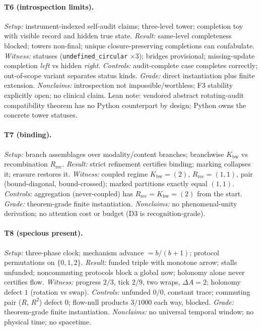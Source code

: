 \documentclass[11pt]{article}
\newcommand{\Kbw}{K_{\mathrm{bw}}}
\newcommand{\Rrec}{R_{\mathrm{rec}}}
\theoremstyle{definition}
\begin{document}
\paragraph{T6 (introspection limits).}
\emph{Setup:} instrument-indexed self-audit claims; three-level tower;
completion toy with visible record and hidden true state. \emph{Result:}
same-level completeness blocked; towers non-final; unique closure-preserving
completions can confabulate. \emph{Witness:} statuses
(\texttt{undefined\_circular} $\times 3$); bridges provisional; missing-update
completion \emph{left} vs hidden \emph{right}. \emph{Controls:}
audit-complete case completes correctly; out-of-scope variant separates
status kinds. \emph{Grade:} direct instantiation plus finite extension.
\emph{Nonclaims:} introspection not impossible/worthless; F3 stability
explicitly open; no clinical claim. Lean note: vendored abstract
rotating-audit compatibility theorem has no Python counterpart by design;
Python owns the concrete tower statuses.

\paragraph{T7 (binding).}
\emph{Setup:} branch assemblages over modality/content branches; branchwise
$\Kbw$ vs recombination $\Rrec$. \emph{Result:} strict refinement certifies
binding; marking collapses it; erasure restores it. \emph{Witness:} coupled
regime $\Kbw = (2)$, $\Rrec = (1,1)$, pair (bound-diagonal, bound-crossed);
marked partitions exactly equal $(1,1)$. \emph{Controls:} aggregation
(never-coupled) has $\Rrec = \Kbw = (2)$ from the start. \emph{Grade:}
theorem-grade finite instantiation. \emph{Nonclaims:} no phenomenal-unity
derivation; no attention cost or budget (D3 is recognition-grade).

\paragraph{T8 (specious present).}
\emph{Setup:} three-phase clock; mechanism advance $= b/(b+1)$; protocol
permutations on $\{0,1,2\}$. \emph{Result:} funded triple with monotone
arrow; stalls unfunded; noncommuting protocols block a global now; holonomy
alone never certifies flow. \emph{Witness:} progress $2/3$, tick $2/9$, two
wraps, $\Delta A = 2$; holonomy defect $1$ (rotation vs swap).
\emph{Controls:} unfunded $0/0$, constant trace; commuting pair
($R$, $R^2$) defect $0$; flow-null products $3/1000$ each way, blocked.
\emph{Grade:} theorem-grade finite instantiation. \emph{Nonclaims:} no
universal temporal window; no physical time; no spacetime.
\end{document}
